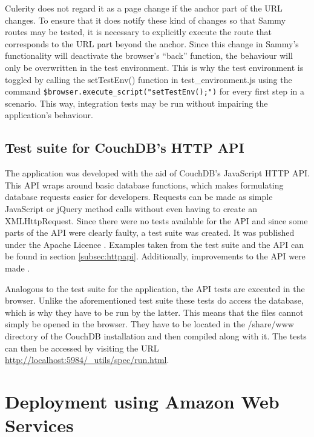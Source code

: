 Culerity does not regard it as a page change if the anchor part of the URL changes. To ensure that it does notify these kind of changes so that Sammy routes may be tested, it is necessary to explicitly execute the route that corresponds to the URL part beyond the anchor. Since this change in Sammy's functionality will deactivate the browser's \enquote{back} function, the behaviour will only be overwritten in the test environment. This is why the test environment is toggled by calling the {\selectfont setTestEnv()} function in {\selectfont test\_environment.js} using the command \lstinline!$browser.execute_script("setTestEnv();")! for every first step in a scenario. This way, integration tests may be run without impairing the application's behaviour.

\subsection{Test suite for CouchDB's HTTP API}
\label{subsec:testsuite}

The application was developed with the aid of CouchDB's JavaScript HTTP API. This API wraps around basic database functions, which makes formulating database requests easier for developers. Requests can be made as simple JavaScript or jQuery method calls without even having to create an XMLHttpRequest. Since there were no tests available for the API and since some parts of the API were clearly faulty, a test suite was created. It was published under the Apache Licence \cite{jira:testsuite}. Examples taken from the test suite and the API can be found in section \ref{subsec:httpapi}. Additionally, improvements to the API were made \cite{jira:bulkdelete, jira:bulksave}.

Analogous to the test suite for the application, the API tests are executed in the browser. Unlike the aforementioned test suite these tests do access the database, which is why they have to be run by the latter. This means that the files cannot simply be opened in the browser. They have to be located in the {\selectfont /share/www} directory of the CouchDB installation and then compiled along with it. The tests can then be accessed by visiting the URL \url{http://localhost:5984/\_utils/spec/run.html}.


\section{Deployment using Amazon Web Services}

